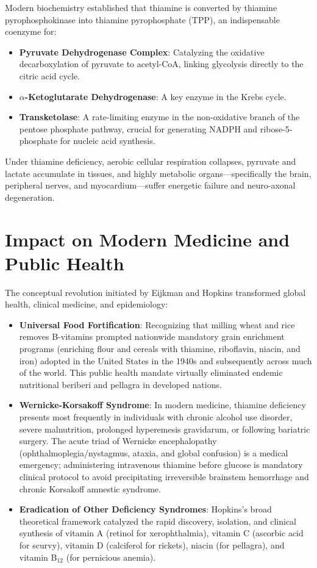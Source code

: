 Modern biochemistry established that thiamine is converted by thiamine pyrophosphokinase into thiamine pyrophosphate (TPP), an indispensable coenzyme for:
\begin{itemize}
    \item \textbf{Pyruvate Dehydrogenase Complex}: Catalyzing the oxidative decarboxylation of pyruvate to acetyl-CoA, linking glycolysis directly to the citric acid cycle.
    \item \textbf{$\alpha$-Ketoglutarate Dehydrogenase}: A key enzyme in the Krebs cycle.
    \item \textbf{Transketolase}: A rate-limiting enzyme in the non-oxidative branch of the pentose phosphate pathway, crucial for generating NADPH and ribose-5-phosphate for nucleic acid synthesis.
\end{itemize}

Under thiamine deficiency, aerobic cellular respiration collapses, pyruvate and lactate accumulate in tissues, and highly metabolic organs—specifically the brain, peripheral nerves, and myocardium—suffer energetic failure and neuro-axonal degeneration.

\section{Impact on Modern Medicine and Public Health}

The conceptual revolution initiated by Eijkman and Hopkins transformed global health, clinical medicine, and epidemiology:
\begin{itemize}
    \item \textbf{Universal Food Fortification}: Recognizing that milling wheat and rice removes B-vitamins prompted nationwide mandatory grain enrichment programs (enriching flour and cereals with thiamine, riboflavin, niacin, and iron) adopted in the United States in the 1940s and subsequently across much of the world. This public health mandate virtually eliminated endemic nutritional beriberi and pellagra in developed nations.
    \item \textbf{Wernicke-Korsakoff Syndrome}: In modern medicine, thiamine deficiency presents most frequently in individuals with chronic alcohol use disorder, severe malnutrition, prolonged hyperemesis gravidarum, or following bariatric surgery. The acute triad of Wernicke encephalopathy (ophthalmoplegia/nystagmus, ataxia, and global confusion) is a medical emergency; administering intravenous thiamine before glucose is mandatory clinical protocol to avoid precipitating irreversible brainstem hemorrhage and chronic Korsakoff amnestic syndrome.
    \item \textbf{Eradication of Other Deficiency Syndromes}: Hopkins's broad theoretical framework catalyzed the rapid discovery, isolation, and clinical synthesis of vitamin A (retinol for xerophthalmia), vitamin C (ascorbic acid for scurvy), vitamin D (calciferol for rickets), niacin (for pellagra), and vitamin B$_{12}$ (for pernicious anemia).
\end{itemize}

